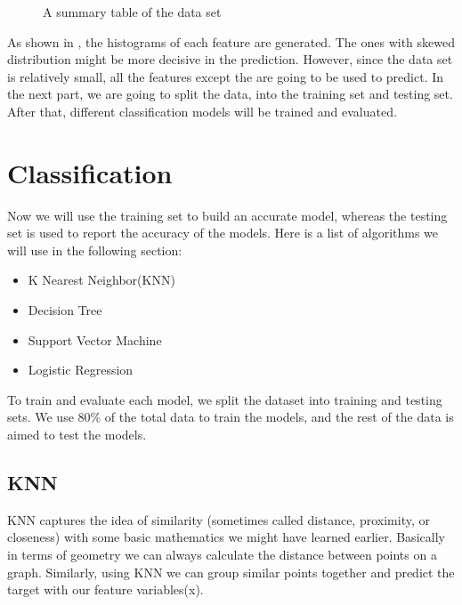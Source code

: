 \documentclass[letterpaper,10pt,english]{jupyterBook}
\let\sphinxpxdimen\pdfpxdimen\else\newdimen\sphinxpxdimen
\begin{document}
\begin{figure}[htbp]
\centering
\capstart

\noindent\sphinxincludegraphics[width=800\sphinxpxdimen]{{fig1}.png}
\caption{A summary table of the data set}\label{\detokenize{analysis:f1}}\end{figure}

\sphinxAtStartPar
As shown in {\hyperref[\detokenize{analysis:f1}]{}}, the histograms of each feature are generated. The ones with skewed distribution might be more decisive in the prediction. However, since the data set is relatively small, all the features except the  are going to be used to predict. In the next part, we are going to split the data, into the training set and testing set. After that, different classification models will be trained and evaluated.


\section{Classification}
\label{\detokenize{analysis:classification}}
\sphinxAtStartPar
Now we will use the training set to build an accurate model, whereas the testing set is used to report the accuracy of the models. Here is a list of algorithms we will use in the following section:
\begin{itemize}
\item {} 
\sphinxAtStartPar
K Nearest Neighbor(KNN)

\item {} 
\sphinxAtStartPar
Decision Tree

\item {} 
\sphinxAtStartPar
Support Vector Machine

\item {} 
\sphinxAtStartPar
Logistic Regression

\end{itemize}

\sphinxAtStartPar
To train and evaluate each model, we split the dataset into training and testing sets. We use 80\% of the total data to train the models, and the rest of the data is aimed to test the models.


\subsection{KNN}
\label{\detokenize{analysis:knn}}
\sphinxAtStartPar
KNN captures the idea of similarity (sometimes called distance, proximity, or closeness) with some basic mathematics we might have learned earlier. Basically in terms of geometry we can always calculate the distance between points on a graph. Similarly, using KNN we can group similar points together and predict the target with our feature variables(x).
\end{document}

